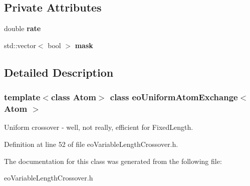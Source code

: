 \subsection*{Private Attributes}
\begin{CompactItemize}
\item 
double {\bf rate}\label{classeo_uniform_atom_exchange_r0}

\item 
std::vector$<$ bool $>$ {\bf mask}\label{classeo_uniform_atom_exchange_r1}

\end{CompactItemize}


\subsection{Detailed Description}
\subsubsection*{template$<$class Atom$>$ class eo\-Uniform\-Atom\-Exchange$<$ Atom $>$}

Uniform crossover - well, not really, efficient for Fixed\-Length. 



Definition at line 52 of file eo\-Variable\-Length\-Crossover.h.

The documentation for this class was generated from the following file:\begin{CompactItemize}
\item 
eo\-Variable\-Length\-Crossover.h\end{CompactItemize}
